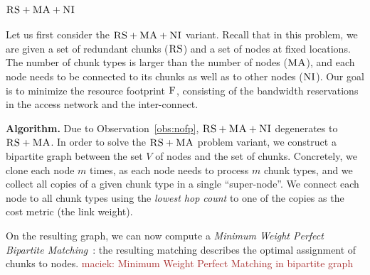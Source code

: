 \documentclass[9pt]{sigcomm-alternate}
\newcommand{\maciek}[1]{\textcolor{brown}{maciek: #1}}
\newcommand{\MaFactor}{m}
\newcommand{\ChunkType}{\tau}
\newcommand{\VirtualNodes}{\ensuremath{V}}
\newcommand{\CC}{\textsc{NI}}
\newcommand{\RS}{\textsc{RS}}
\newcommand{\MA}{\textsc{MA}}
\newcommand{\Cost}{\textsc{F}}
\begin{document}
\subsubsection{$\RS+\MA+\CC$}

Let us first consider the $\RS+\MA+\CC$ variant.
Recall that in this problem,
we are given a set of redundant chunks ($\RS$) and a set of nodes
at fixed locations. The number of chunk types is larger than the number
of nodes ($\MA$), and each node needs to be connected
to its chunks as well as to other nodes ($\CC$).
Our goal is to minimize the resource footprint $\Cost$, consisting
of the bandwidth reservations in the access network and the inter-connect.

\textbf{Algorithm.} Due to Observation~\ref{obs:nofp}, $\RS+\MA+\CC$ degenerates to $\RS+\MA$.
In order to solve the $\RS+\MA$ problem variant,
we construct a bipartite
graph between the set
$\VirtualNodes$ of nodes and
the set of chunks.
Concretely, we clone each node $\MaFactor$ times,
as each node needs to process
$\MaFactor$ chunk types, and we collect all copies of a given chunk type in a
single %
``super-node''. We connect each node to all chunk types using the
\emph{lowest hop count} to one of the copies as the cost metric (the link weight).

On the resulting graph, we can now compute a \emph{Minimum Weight
Perfect Bipartite
Matching}~\cite{gabow_scaling_algorithm}:
the resulting matching describes the optimal assignment of chunks to nodes. \maciek{Minimum Weight Perfect Matching in bipartite graph}

\end{document}
